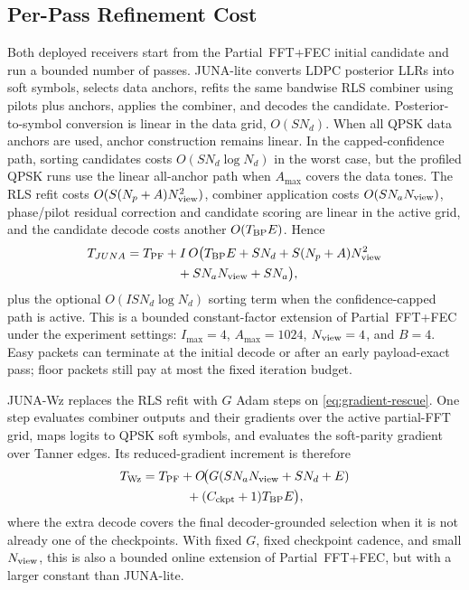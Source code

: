\documentclass[journal]{IEEEtran}
\newcommand{\juna}{JUNA}
\newcommand{\junalite}{JUNA-lite}
\newcommand{\junawz}{JUNA-Wz}
\begin{document}
\subsection{Per-Pass Refinement Cost}
Both deployed receivers start from the Partial~FFT+FEC initial candidate and run a bounded
number of passes. \junalite{} converts LDPC posterior LLRs into soft symbols,
selects data anchors, refits the same bandwise RLS combiner using pilots plus
anchors, applies the combiner, and decodes the candidate. Posterior-to-symbol
conversion is linear in the data
grid, $O(SN_d)$. When all QPSK data anchors are used, anchor construction remains
linear. In the capped-confidence path, sorting candidates costs
$O(SN_d\log N_d)$ in the worst case, but the profiled QPSK runs use the linear
all-anchor path when $A_{\max}$ covers the data tones. The RLS refit costs
$O(S(N_p+A)N_{\rm view}^2)$, combiner application costs $O(SN_aN_{\rm view})$, phase/pilot residual
correction and candidate scoring are linear in the active grid, and the candidate
decode costs another $O(T_{\rm BP}E)$. Hence
\begin{equation}
\begin{aligned}
  T_{\juna}
  ={}& T_{\rm PF}
  + I\,O\big(T_{\rm BP}E+SN_d+S(N_p+A)N_{\rm view}^2\\
  &\hspace{2.7em}+SN_aN_{\rm view}+SN_a\big),
\end{aligned}
  \label{eq:juna-complexity}
\end{equation}
plus the optional $O(ISN_d\log N_d)$ sorting term when the confidence-capped path
is active. This is a bounded constant-factor extension of Partial~FFT+FEC under
the experiment settings: $I_{\max}=4$, $A_{\max}=1024$, $N_{\rm view}=4$, and $B=4$. Easy
packets can terminate at the initial decode or after an early payload-exact pass;
floor packets still pay at most the fixed iteration budget.

\junawz{} replaces the RLS refit with $G$ Adam steps on
\eqref{eq:gradient-rescue}. One step evaluates combiner outputs and their
gradients over the active partial-FFT grid, maps logits to QPSK soft symbols, and
evaluates the soft-parity gradient over Tanner edges. Its reduced-gradient
increment is therefore
\begin{equation}
\begin{aligned}
  T_{\rm Wz}
  ={}&T_{\rm PF}
   +O\!\big(G(SN_aN_{\rm view}+SN_d+E)\\
   &\hspace{2.2em}+(C_{\rm ckpt}+1)T_{\rm BP}E\big),
\end{aligned}
  \label{eq:wz-complexity}
\end{equation}
where the extra decode covers the final decoder-grounded selection when it is
not already one of the checkpoints. With fixed $G$, fixed checkpoint cadence, and
small $N_{\rm view}$, this is also a bounded online extension of Partial~FFT+FEC,
but with a larger constant than \junalite{}.
\end{document}
